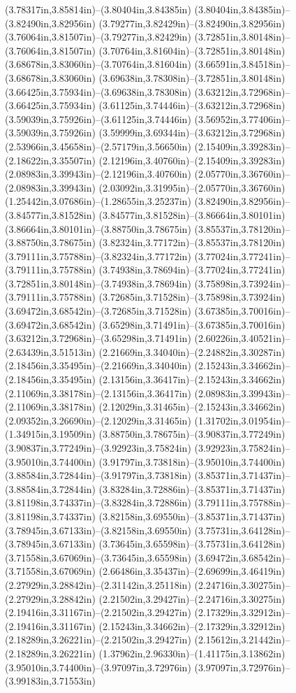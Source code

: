 (3.78317in,3.85814in)--(3.80404in,3.84385in) (3.80404in,3.84385in)--(3.82490in,3.82956in) (3.79277in,3.82429in)--(3.82490in,3.82956in) (3.76064in,3.81507in)--(3.79277in,3.82429in) (3.72851in,3.80148in)--(3.76064in,3.81507in) (3.70764in,3.81604in)--(3.72851in,3.80148in) (3.68678in,3.83060in)--(3.70764in,3.81604in) (3.66591in,3.84518in)--(3.68678in,3.83060in) (3.69638in,3.78308in)--(3.72851in,3.80148in) (3.66425in,3.75934in)--(3.69638in,3.78308in) (3.63212in,3.72968in)--(3.66425in,3.75934in) (3.61125in,3.74446in)--(3.63212in,3.72968in) (3.59039in,3.75926in)--(3.61125in,3.74446in) (3.56952in,3.77406in)--(3.59039in,3.75926in) (3.59999in,3.69344in)--(3.63212in,3.72968in) (2.53966in,3.45658in)--(2.57179in,3.56650in) (2.15409in,3.39283in)--(2.18622in,3.35507in) (2.12196in,3.40760in)--(2.15409in,3.39283in) (2.08983in,3.39943in)--(2.12196in,3.40760in) (2.05770in,3.36760in)--(2.08983in,3.39943in) (2.03092in,3.31995in)--(2.05770in,3.36760in) (1.25442in,3.07686in)--(1.28655in,3.25237in) (3.82490in,3.82956in)--(3.84577in,3.81528in) (3.84577in,3.81528in)--(3.86664in,3.80101in) (3.86664in,3.80101in)--(3.88750in,3.78675in) (3.85537in,3.78120in)--(3.88750in,3.78675in) (3.82324in,3.77172in)--(3.85537in,3.78120in) (3.79111in,3.75788in)--(3.82324in,3.77172in) (3.77024in,3.77241in)--(3.79111in,3.75788in) (3.74938in,3.78694in)--(3.77024in,3.77241in) (3.72851in,3.80148in)--(3.74938in,3.78694in) (3.75898in,3.73924in)--(3.79111in,3.75788in) (3.72685in,3.71528in)--(3.75898in,3.73924in) (3.69472in,3.68542in)--(3.72685in,3.71528in) (3.67385in,3.70016in)--(3.69472in,3.68542in) (3.65298in,3.71491in)--(3.67385in,3.70016in) (3.63212in,3.72968in)--(3.65298in,3.71491in) (2.60226in,3.40521in)--(2.63439in,3.51513in) (2.21669in,3.34040in)--(2.24882in,3.30287in) (2.18456in,3.35495in)--(2.21669in,3.34040in) (2.15243in,3.34662in)--(2.18456in,3.35495in) (2.13156in,3.36417in)--(2.15243in,3.34662in) (2.11069in,3.38178in)--(2.13156in,3.36417in) (2.08983in,3.39943in)--(2.11069in,3.38178in) (2.12029in,3.31465in)--(2.15243in,3.34662in) (2.09352in,3.26690in)--(2.12029in,3.31465in) (1.31702in,3.01954in)--(1.34915in,3.19509in) (3.88750in,3.78675in)--(3.90837in,3.77249in) (3.90837in,3.77249in)--(3.92923in,3.75824in) (3.92923in,3.75824in)--(3.95010in,3.74400in) (3.91797in,3.73818in)--(3.95010in,3.74400in) (3.88584in,3.72844in)--(3.91797in,3.73818in) (3.85371in,3.71437in)--(3.88584in,3.72844in) (3.83284in,3.72886in)--(3.85371in,3.71437in) (3.81198in,3.74337in)--(3.83284in,3.72886in) (3.79111in,3.75788in)--(3.81198in,3.74337in) (3.82158in,3.69550in)--(3.85371in,3.71437in) (3.78945in,3.67133in)--(3.82158in,3.69550in) (3.75731in,3.64128in)--(3.78945in,3.67133in) (3.73645in,3.65598in)--(3.75731in,3.64128in) (3.71558in,3.67069in)--(3.73645in,3.65598in) (3.69472in,3.68542in)--(3.71558in,3.67069in) (2.66486in,3.35437in)--(2.69699in,3.46419in) (2.27929in,3.28842in)--(2.31142in,3.25118in) (2.24716in,3.30275in)--(2.27929in,3.28842in) (2.21502in,3.29427in)--(2.24716in,3.30275in) (2.19416in,3.31167in)--(2.21502in,3.29427in) (2.17329in,3.32912in)--(2.19416in,3.31167in) (2.15243in,3.34662in)--(2.17329in,3.32912in) (2.18289in,3.26221in)--(2.21502in,3.29427in) (2.15612in,3.21442in)--(2.18289in,3.26221in) (1.37962in,2.96330in)--(1.41175in,3.13862in) (3.95010in,3.74400in)--(3.97097in,3.72976in) (3.97097in,3.72976in)--(3.99183in,3.71553in) 